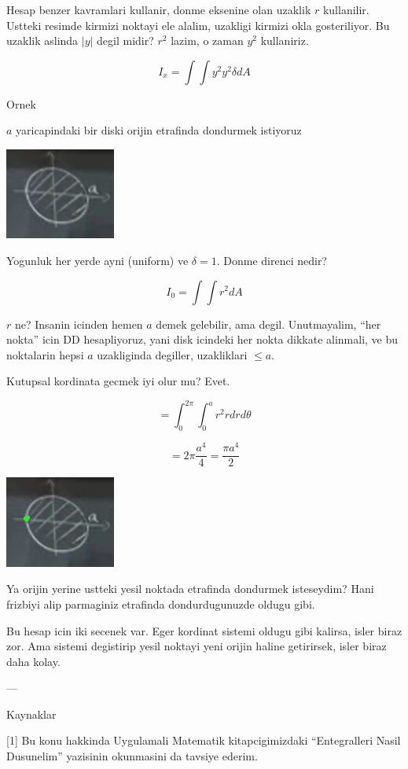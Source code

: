 \documentclass[12pt,fleqn]{article}
\begin{document}
Hesap benzer kavramlari kullanir, donme eksenine olan uzaklik $r$
kullanilir. Ustteki resimde kirmizi noktayi ele alalim, uzakligi kirmizi
okla gosteriliyor. Bu uzaklik aslinda $|y|$ degil midir? $r^2$ lazim, o
zaman $y^2$ kullaniriz. 

\[ I_x = \int \int y^2 y^2 \delta dA \]

Ornek

$a$ yaricapindaki bir diski orijin etrafinda dondurmek istiyoruz 

\includegraphics[height=3cm]{17_7.png}

Yogunluk her yerde ayni (uniform) ve $\delta = 1$. Donme direnci nedir? 

\[ I_0 = \int \int r^2 dA \]

$r$ ne? Insanin icinden hemen $a$ demek gelebilir, ama degil. Unutmayalim,
``her nokta'' icin DD hesapliyoruz, yani disk icindeki her nokta dikkate
alinmali, ve bu noktalarin hepsi $a$ uzakliginda degiller, uzakliklari $\le
a$. 

Kutupsal kordinata gecmek iyi olur mu? Evet. 

\[ = \int_0^{2\pi} \int_0^a r^2 r dr d\theta \]


\[ = 2\pi \frac{a^4}{4} = \frac{\pi a^4}{2} \]

\includegraphics[height=3cm]{17_8.png}

Ya orijin yerine ustteki yesil noktada etrafinda dondurmek isteseydim? Hani
frizbiyi alip parmaginiz etrafinda dondurdugunuzde oldugu gibi. 

Bu hesap icin iki secenek var. Eger kordinat sistemi oldugu gibi kalirsa,
isler biraz zor. Ama sistemi degistirip yesil noktayi yeni orijin haline
getirirsek, isler biraz daha kolay. 














---

Kaynaklar

[1] Bu konu hakkinda Uygulamali Matematik kitapcigimizdaki ``Entegralleri
Nasil Dusunelim'' yazisinin okunmasini da tavsiye ederim. 
\end{document}
